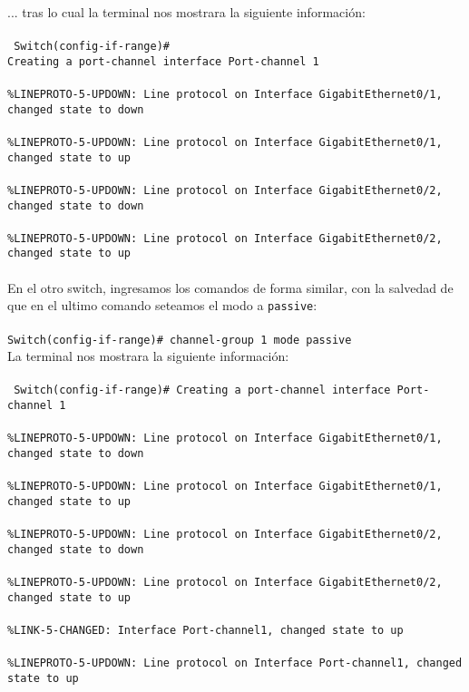 \documentclass{article}
\begin{document}
... tras lo cual la terminal nos mostrara la siguiente información: \\\\
\texttt{
    Switch(config-if-range)\# \\
    Creating a port-channel interface Port-channel 1 \\\\
    \%LINEPROTO-5-UPDOWN: Line protocol on Interface GigabitEthernet0/1, changed state to down \\\\
    \%LINEPROTO-5-UPDOWN: Line protocol on Interface GigabitEthernet0/1, changed state to up \\\\
    \%LINEPROTO-5-UPDOWN: Line protocol on Interface GigabitEthernet0/2, changed state to down \\\\
    \%LINEPROTO-5-UPDOWN: Line protocol on Interface GigabitEthernet0/2, changed state to up \\
} \\

En el otro switch, ingresamos los comandos de forma similar, con la salvedad de que en el ultimo comando seteamos el modo a \texttt{passive}: \\\\
\texttt{Switch(config-if-range)# channel-group 1 mode passive} \\

La terminal nos mostrara la siguiente información: \\\\
\texttt{
Switch(config-if-range)#
    Creating a port-channel interface Port-channel 1 \\\\
    \%LINEPROTO-5-UPDOWN: Line protocol on Interface GigabitEthernet0/1, changed state to down \\\\
    \%LINEPROTO-5-UPDOWN: Line protocol on Interface GigabitEthernet0/1, changed state to up \\\\
    \%LINEPROTO-5-UPDOWN: Line protocol on Interface GigabitEthernet0/2, changed state to down \\\\
    \%LINEPROTO-5-UPDOWN: Line protocol on Interface GigabitEthernet0/2, changed state to up \\\\
    \%LINK-5-CHANGED: Interface Port-channel1, changed state to up \\\\
    \%LINEPROTO-5-UPDOWN: Line protocol on Interface Port-channel1, changed state to up \\
} \\
\end{document}
